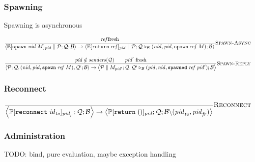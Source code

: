 \documentclass{article}
\newcommand{\sReturn}{\mathtt{return}}
\newcommand{\sSpawn}{\mathtt{spawn}}
\newcommand{\sReconnect}{\mathtt{reconnect}}
\newcommand{\sSpawned}{\mathtt{spawned}}
\newcommand{\sExtend}[1]{\mathrel{\triangleright_{#1}}}
\newcommand{\sPar}{\mathrel{\parallel}}
\newcommand{\sPid}{\ensuremath{\mathit{pid}}}
\newcommand{\sNid}{\ensuremath{\mathit{nid}}}
\newcommand{\sId}{\ensuremath{\mathit{id}}}
\newcommand{\sRef}{\ensuremath{\mathit{ref}}}
\newcommand{\sSystem}[3]{\left\langle #1 ; #2 ; #3 \right\rangle}
\newcommand{\sQueue}{\mathcal{Q}}
\newcommand{\sProcesses}{\mathcal{P}}
\newcommand{\sBlacklist}{\mathcal{B}}
\newcommand{\sCtxt}[1]{\mathbb{#1}}
\newcommand{\sSenders}{\mathit{senders}}
\begin{document}
\subsubsection{Spawning}

Spawning is asynchronous

\begin{equation*}
\frac{
  \text{\sRef fresh} 
}{
  \sSystem{\sCtxt{E}[ \sSpawn \; \sNid \; M ]_\sPid \sPar \sProcesses}
          {\sQueue}
          {\sBlacklist}
\rightarrow          
  \sSystem{\sCtxt{E}[ \sReturn \; \sRef ]_\sPid \sPar \sProcesses}
          {\sQueue \sExtend{\sBlacklist} (\sNid, \sPid, \sSpawn \; \sRef \; M)}
          {\sBlacklist}
} \textsc{Spawn-Async}
\end{equation*}


\begin{equation*}
\frac{
  \sPid \notin \sSenders(\sQueue)
\qquad
  \text{$\sPid'$ fresh}
}{
  \sSystem{\sProcesses}
          {\sQueue, (\sNid, \sPid, \sSpawn \; \sRef \; M), \sQueue'}
          {\sBlacklist}
\rightarrow
  \sSystem{\sProcesses \sPar M_{\sPid'}}
          {\sQueue, \sQueue' \sExtend{\sBlacklist} (\sPid, \sNid, \sSpawned \; \sRef \; \sPid')}
          {\sBlacklist}
} \textsc{Spawn-Reply}
\end{equation*}

\subsubsection{Reconnect}

\begin{equation*}
\frac{
}{
  \sSystem{\sCtxt{P}[ \sReconnect \; \sId_\mathit{to} ]_{\sPid_\mathit{fr}}}
          {\sQueue}
          {\sBlacklist}
\rightarrow
  \sSystem{\sCtxt{P}[ \sReturn \; () ]_\sPid}
          {\sQueue}
          {\sBlacklist \backslash (\sPid_\mathit{to}, \sPid_\mathit{fr})}
} \textsc{Reconnect}
\end{equation*}

\subsubsection{Administration}

TODO: bind, pure evaluation, maybe exception handling
\end{document}
